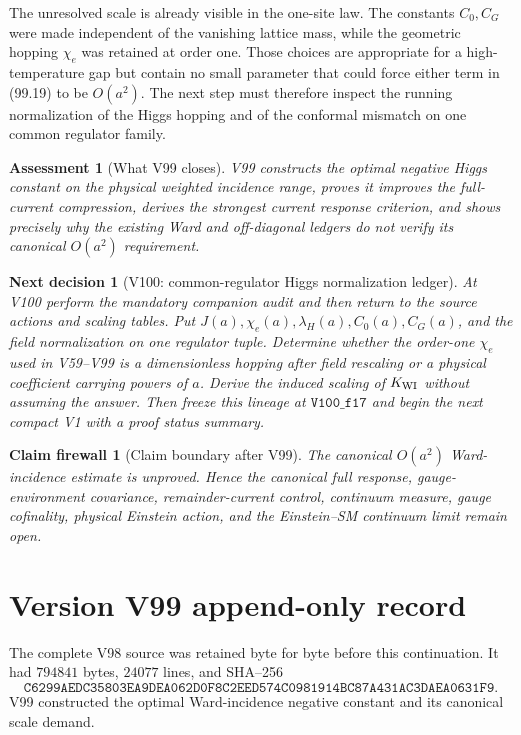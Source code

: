 \documentclass[11pt]{article}
\newtheorem{firewall}[theorem]{Claim firewall}
\newtheorem{decision}[theorem]{Next decision}
\newtheorem{assessment}[theorem]{Assessment}
\theoremstyle{remark}
\begin{document}
The unresolved scale is already visible in the one-site law.  The
constants \(C_0,C_G\) were made independent of the vanishing lattice
mass, while the geometric hopping \(\chi_e\) was retained at order
one.  Those choices are appropriate for a high-temperature gap but
contain no small parameter that could force either term in (99.19) to
be \(O(a^2)\).  The next step must therefore inspect the running
normalization of the Higgs hopping and of the conformal mismatch on one
common regulator family.

\begin{assessment}[What V99 closes]
\label{ass:v17v99-status}
V99 constructs the optimal negative Higgs constant on the physical
weighted incidence range, proves it improves the full-current
compression, derives the strongest current response criterion, and
shows precisely why the existing Ward and off-diagonal ledgers do not
verify its canonical \(O(a^2)\) requirement.
\end{assessment}

\begin{decision}[V100: common-regulator Higgs normalization ledger]
\label{dec:v17v99-next}
At V100 perform the mandatory companion audit and then return to the
source actions and scaling tables.  Put \(J(a),\chi_e(a),\lambda_H(a),
C_0(a),C_G(a)\), and the field normalization on one regulator tuple.
Determine whether the order-one \(\chi_e\) used in V59--V99 is a
dimensionless hopping after field rescaling or a physical coefficient
carrying powers of \(a\).  Derive the induced scaling of
\(K_{\rm WI}\) without assuming the answer.  Then freeze this lineage
at \(\texttt{V100\_f17}\) and begin the next compact V1 with a proof
status summary.
\end{decision}

\begin{firewall}[Claim boundary after V99]
\label{fire:v17v99}
The canonical \(O(a^2)\) Ward-incidence estimate is unproved.  Hence
the canonical full response, gauge-environment covariance,
remainder-current control, continuum measure, gauge cofinality,
physical Einstein action, and the Einstein--SM continuum limit remain
open.
\end{firewall}

\section*{Version V99 append-only record}
The complete V98 source was retained byte for byte before this
continuation.  It had \(794841\) bytes, \(24077\) lines, and SHA--256
\[
 \texttt{C6299AEDC35803EA9DEA062D0F8C2EED574C0981914BC87A431AC3DAEA0631F9}.
\]
V99 constructed the optimal Ward-incidence negative constant and its
canonical scale demand.
\end{document}

